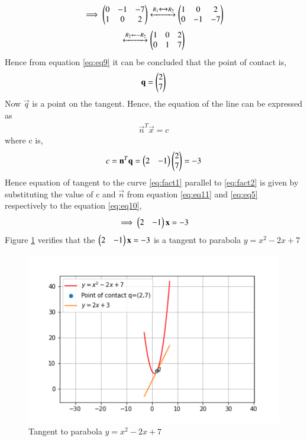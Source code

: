 \documentclass[journal,12pt,twocolumn]{IEEEtran}
\begin{document}
\begin{enumerate}
\begin{align}
			\implies \begin{pmatrix}0&-1&-7\\1&0&2\end{pmatrix} \xleftrightarrow[]{R_1\xleftrightarrow[]{}R_2} \begin{pmatrix}1&0&2\\0&-1&-7\end{pmatrix}
		\end{align}
		\begin{align}
			\xleftrightarrow[]{R_2\leftarrow  -R_2} \begin{pmatrix}1&0&2\\0&1&7\end{pmatrix}
			\label{eq:eq9}
		\end{align}
		Hence from equation \eqref{eq:eq9} it can be concluded that the point of contact is,
		\begin{align}
			\mathbf{q} = \begin{pmatrix}2\\7\end{pmatrix}
		\end{align}
		Now $\vec{q}$ is a point on the tangent. Hence, the equation of the
		line can be expressed as
		\begin{align}
			\vec{n}^T\vec{x} = c
			\label{eq:eq10}
		\end{align}
		where c is,
		\begin{align}
			c = \mathbf{n}^T\mathbf{q} = \begin{pmatrix}2&-1\end{pmatrix}\begin{pmatrix}2\\7\end{pmatrix} = -3 
			\label{eq:eq11}
		\end{align}
		Hence equation of tangent to the curve \eqref{eq:fact1} parallel to \eqref{eq:fact2} is given by substituting the value of c and $\vec{n}$ from equation \eqref{eq:eq11} and \eqref{eq:eq5} respectively to the equation \eqref{eq:eq10},
		\begin{align}
			\implies\begin{pmatrix}2&-1\end{pmatrix}\mathbf{x} = -3 
		\end{align}
		Figure \ref{eq:fig1} verifies that the $\begin{pmatrix}2&-1\end{pmatrix}\mathbf{x} = -3$ is a tangent to parabola  $y = x^2-2x+7$
		\begin{figure}[ht!]
			\centering
			\includegraphics[width=\columnwidth]{./codes/parallelLineTangent.png}
			\caption{Tangent to parabola $y = x^2-2x+7$}
			\label{eq:fig1}
		\end{figure}
	

\end{enumerate}
\end{document}
